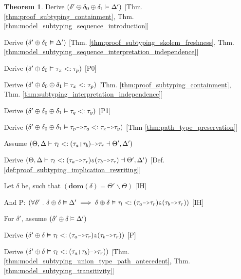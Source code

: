 \documentclass[acmsmall]{acmart}
\theoremstyle{definition}
\newtheorem{theorem}{Theorem}[section]
\begin{document}
\begin{theorem}
  \item \I\I \N Derive $(\delta' \oplus \delta_0 \oplus \delta_1 \vDash \Delta')$
    [Thm. \ref{thm:proof_subtyping_containment}, Thm. \ref{thm:model_subtyping_sequence_introduction}]
  \item \I\I \N Derive $(\delta' \oplus \delta_0 \vDash \Delta')$
    [Thm. \ref{thm:proof_subtyping_skolem_freshness}, Thm. \ref{thm:model_subtyping_sequence_interpretation_independence}]
  \item \I\I \N Derive $(
    \delta' \oplus \delta_0 \vDash \tau_x <: \tau_p
  )$ [P0]

  \item \I\I \N Derive $(
    \delta' \oplus \delta_0 \oplus \delta_1 \vDash \tau_x <: \tau_p
  )$ [Thm. \ref{thm:proof_subtyping_containment}, Thm. \ref{thm:subtyping_interpretation_independence}]

  \item \I\I \N Derive $(
    \delta' \oplus \delta_0 \oplus \delta_1 \vDash \tau_q <: \tau_y
  )$ [P1]

  \item \I\I \N Derive $(
    \delta' \oplus \delta_0 \oplus \delta_1 \satisfies \tau_p \J{->} \tau_q \subtypes \tau_x \J{->} \tau_y
  )$ [Thm \ref{thm:path_type_preservation}]


  \item \N Assume $(
      \Theta, \Delta \entails 
      \tau_l \subtypes 
      (\tau_a\J{|}\tau_b)\J{->}\tau_r
      \given \Theta', \Delta' 
  )$ 
  \item \I \N Derive $(
    \Theta, \Delta \entails 
    \tau_l \subtypes
    (\tau_a\J{->}\tau_r)\J{\&}(\tau_b\J{->}\tau_r)
    \given \Theta', \Delta'
  )$ [Def. \ref{def:proof_subtyping_implication_rewriting}]

  \item \I \N Let $\delta$ be, such that $(
    \textbf{dom}(\delta) = \Theta' \backslash \Theta
  )$ [IH]
  \item \I \N And P: $(
    \forall \delta' \qua 
    \delta \oplus \delta \satisfies \Delta' 
    \implies 
    \delta \oplus \delta \satisfies \tau_l \subtypes (\tau_a\J{->}\tau_r)\J{\&}(\tau_b\J{->}\tau_r) 
  )$ [IH]
  \item \I \N For $\delta'$, assume $(\delta' \oplus \delta \vDash \Delta')$
  \item \I\I \N Derive $(
    \delta' \oplus \delta \satisfies \tau_l \subtypes (\tau_a\J{->}\tau_r)\J{\&}(\tau_b\J{->}\tau_r)
  )$ [P]
  \item \I\I \N Derive $(
    \delta' \oplus \delta \satisfies \tau_l \subtypes (\tau_a\J{|}\tau_b)\J{->}\tau_r)
  )$ [Thm. \ref{thm:model_subtyping_union_type_path_antecedent}, Thm. \ref{thm:model_subtyping_transitivity}]


\end{theorem}
\end{document}
